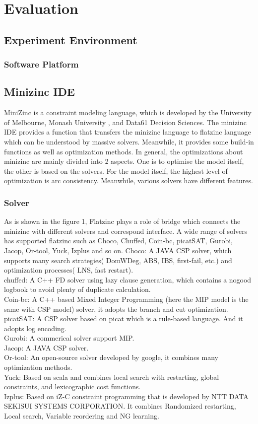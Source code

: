 \chapter{Evaluation}
\label{cha:evaluation}
\section{Experiment Environment}
\subsection{Software Platform}
\label{sec:softplat}
\section{Minizinc IDE}
MiniZinc is a constraint modeling language, which is developed by the University of Melbourne, Monash University , and Data61 Decision Sciences\cite{r6}. The minizinc IDE provides a function that transfers the minizinc language to flatzinc language which can be understood by massive solvers\cite{r5}. Meanwhile, it provides some build-in functions as well as optimization methods. In general, the optimizations about minizinc are mainly divided into 2 aspects. One is to optimise the model itself, the other is based on the solvers. For the model itself, the highest level of optimization is arc consistency. Meanwhile, various solvers have different features.
\subsection{Solver}
As is shown in the figure 1, Flatzinc plays a role of bridge which connects the minizinc with different solvers and correspond interface. A wide range of solvers has supported flatzinc such as Choco, Chuffed, Coin-bc, picatSAT, Gurobi, Jacop, Or-tool, Yuck, Izplus and so on.
Choco: A JAVA CSP solver, which supports many search strategies( DomWDeg, ABS, IBS, first-fail, etc.) and optimization processes( LNS, fast restart).\\
chuffed: A C++ FD solver using lazy clause generation, which contains a nogood logbook to avoid plenty of duplicate calculation.\\
Coin-bc: A C++ based Mixed Integer Programming (here the MIP model is the same with CSP model) solver, it adopts the branch and cut optimization.\\
picatSAT: A CSP solver based on picat which is a rule-based language. And it adopts log encoding\cite{r8}.\\
Gurobi: A commerical solver support MIP.\\
Jacop: A JAVA CSP solver.\\
Or-tool: An open-source solver developed by google, it combines many optimization methods.\\
Yuck: Based on scala and combines local search with restarting, global constraints, and lexicographic cost functions.\\
Izplus: Based on iZ-C constraint programming that is developed by NTT DATA SEKISUI SYSTEMS CORPORATION. It combines Randomized restarting, Local search, Variable reordering and NG learning.

